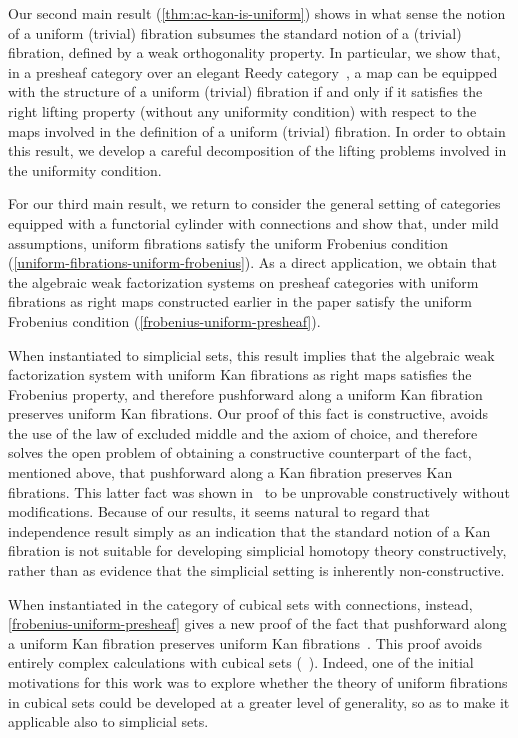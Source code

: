 \documentclass[reqno,10pt,a4paper,oneside,draft]{amsart}
\begin{document}
Our second main result (\cref{thm:ac-kan-is-uniform}) shows in what sense the notion of a uniform (trivial) fibration subsumes the standard notion of a (trivial) fibration, defined by a weak orthogonality property.
In particular, we show that, in a presheaf category over an elegant Reedy category~\cite{bergner-rezk-elegant}, a map can be equipped with the structure of a uniform (trivial) fibration if and only if it satisfies the right lifting property (without any uniformity condition) with respect to the maps involved in the definition of a uniform (trivial) fibration.
In order to obtain this result, we develop a careful decomposition of the lifting problems involved in the uniformity condition.

For our third main result, we return to consider the general setting of categories equipped with a functorial cylinder with connections and show that, under mild assumptions, uniform fibrations satisfy the uniform Frobenius condition (\cref{uniform-fibrations-uniform-frobenius}).
As a direct application, we obtain that the algebraic weak factorization systems on presheaf categories with uniform fibrations as right maps constructed earlier in the paper satisfy the uniform Frobenius condition (\cref{frobenius-uniform-presheaf}).

When instantiated to simplicial sets, this result implies that the algebraic weak factorization system with uniform Kan fibrations as right maps satisfies the Frobenius property, and therefore pushforward along a uniform Kan fibration preserves uniform Kan fibrations.
Our proof of this fact is constructive, \ie avoids the use of the law of excluded middle and the axiom of choice, and therefore solves the open problem of obtaining a constructive counterpart of the fact, mentioned above, that pushforward along a Kan fibration preserves Kan fibrations.
This latter fact was shown in~\cite{coquand-non-constructivity-kan} to be unprovable constructively without modifications.
Because of our results, it seems natural to regard that independence result simply as an indication that the standard notion of a Kan fibration is not suitable for developing simplicial homotopy theory constructively, rather than as evidence that the simplicial setting is inherently non-constructive. 

When instantiated in the category of cubical sets with connections, instead, \cref{frobenius-uniform-presheaf} gives a new proof of the fact that pushforward along a uniform Kan fibration preserves uniform Kan fibrations~\cite{cohen-et-al:cubicaltt}.
This proof avoids entirely complex calculations with cubical sets (\cf~\cite{huber-thesis}).
Indeed, one of the initial motivations for this work was to explore whether the theory of uniform fibrations in cubical sets could be developed at a greater level of generality, so as to make it applicable also to simplicial sets.
\end{document}
